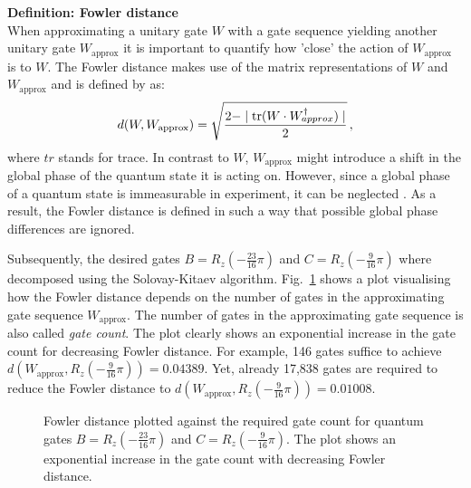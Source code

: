 
\begin{redbox}
\textbf{Definition: Fowler distance}\\
\newline
When approximating a unitary gate $W$ with a gate sequence yielding another unitary gate $W_\mathrm{approx}$ it is important to quantify how 'close' the action of $W_\mathrm{approx}$ is to $W$. The Fowler distance makes use of the matrix representations of $W$ and $W_\mathrm{approx}$ and is defined by  as:
\begin{equation}
d(W,W_\mathrm{approx}) = \sqrt{\frac{2-\mid \mathrm{tr}(W\cdot W_{\mathrm\mathrm{approx}}^\dagger)\mid}{2}}\, ,
\end{equation}
where $tr$ stands for trace. In contrast to $W$, $W_\mathrm{approx}$ might introduce a shift in the global phase of the quantum state it is acting on. However, since a global phase of a quantum state is immeasurable in experiment, it can be neglected \cite{nielsen2010quantum}. As a result, the Fowler distance is defined in such a way that possible global phase differences are ignored.
\end{redbox}

Subsequently, the desired gates $B = R_z(-\frac{23}{16}\pi)$ and $C = R_z(-\frac{9}{16}\pi)$ where decomposed using the Solovay-Kitaev algorithm. Fig.~\ref{fig:skresultplot} shows a plot visualising how the Fowler distance depends on the number of gates in the approximating gate sequence $W_\mathrm{approx}$. The number of gates in the approximating gate sequence is also called \emph{gate count}. The plot clearly shows an exponential increase in the gate count for decreasing Fowler distance. For example, 146 gates suffice to achieve $d(W_\mathrm{approx},R_z(-\frac{9}{16}\pi)) = 0.04389$. Yet, already 17,838 gates are required to reduce the Fowler distance to $d(W_\mathrm{approx},R_z(-\frac{9}{16}\pi)) = 0.01008$.

\begin{figure}[H]
\centering
\caption{Fowler distance plotted against the required gate count for quantum gates $B = R_z(-\frac{23}{16}\pi)$ and $C = R_z(-\frac{9}{16}\pi)$. The plot shows an exponential increase in the gate count with decreasing Fowler distance.}
\label{fig:skresultplot}
  \end{figure}

